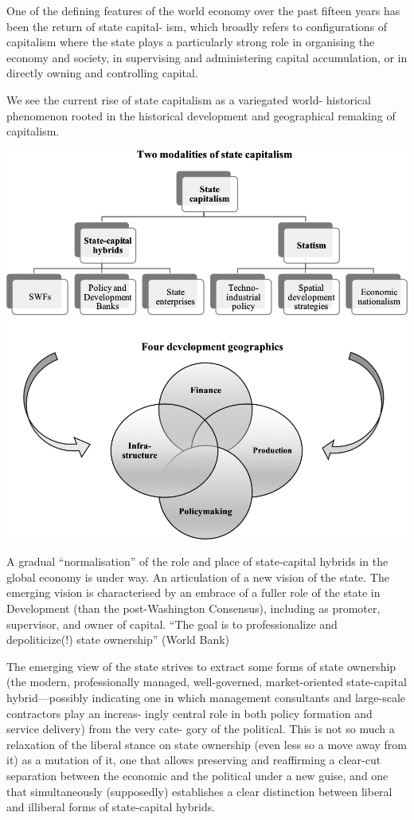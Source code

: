 \documentclass[
]{book}
\begin{document}
One of the defining features of
the world economy over the past fifteen years has been the return of state capital-
ism, which broadly refers to configurations of capitalism where the state plays a
particularly strong role in organising the economy and society, in supervising and
administering capital accumulation, or in directly owning and controlling capital.

We see the current rise of state capitalism as a variegated world-
historical phenomenon rooted in the historical development and geographical
remaking of capitalism.

\includegraphics{fig/state_capitalism_development_regime.png}

A gradual ``normalisation'' of the role and place of state-capital hybrids in the
global economy is under way.
An articulation of a new vision of the state.
The emerging vision is characterised by an embrace of a fuller
role of the state in Development (than the post-Washington Consensus), including
as promoter, supervisor, and owner of capital.
``The goal is to professionalize and
depoliticize(!) state ownership'' (World Bank)

The emerging view of
the state strives to extract some forms of state ownership (the modern, professionally
managed, well-governed, market-oriented state-capital hybrid---possibly indicating
one in which management consultants and large-scale contractors play an increas-
ingly central role in both policy formation and service delivery) from the very cate-
gory of the political. This is not so much a relaxation of the liberal stance on state
ownership (even less so a move away from it) as a mutation of it, one that allows
preserving and reaffirming a clear-cut separation between the economic and the
political under a new guise, and one that simultaneously (supposedly) establishes a
clear distinction between liberal and illiberal forms of state-capital hybrids.
\end{document}
